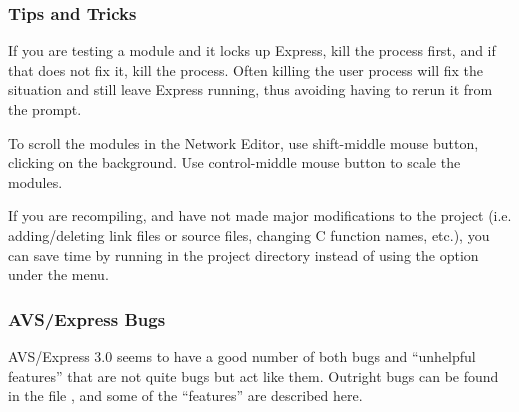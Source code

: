 
\subsubsection{Tips and Tricks}
\label{Tips and Tricks}

If you are testing a module and it locks up Express, kill the 
process first, and if that does not fix it, kill the  process.
Often killing the user process will fix the situation and still leave
Express running, thus avoiding having to rerun it from the prompt.

To scroll the modules in the Network Editor, use shift-middle mouse button,
clicking on the background.  Use control-middle mouse button to scale the
modules.

If you are recompiling, and have not made major modifications to the
project (i.e. adding/deleting link files or source files, changing C
function names, etc.), you can save time by running  in
the project directory instead of using the  option under the
 menu.



\subsubsection{AVS/Express Bugs}
\label{AVS/Express Bugs}

AVS/Express 3.0 seems to have a good number of both bugs and ``unhelpful
features'' that are not quite bugs but act like them.  Outright bugs can be
found in the file , and some of the ``features'' are described
here.

